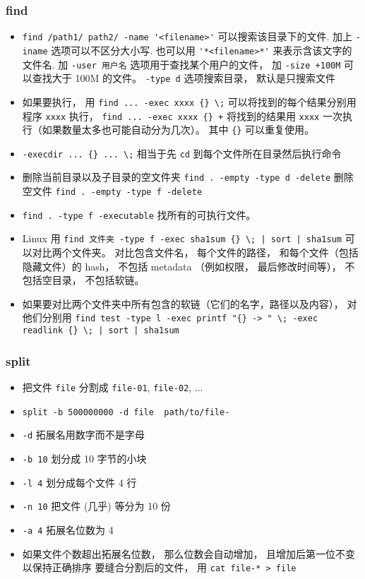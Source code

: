 \subsubsection{find}
\begin{itemize}
\item \verb`find /path1/ path2/ -name '<filename>'` 可以搜索该目录下的文件. 加上 \verb`-iname` 选项可以不区分大小写. 也可以用 \verb`'*<filename>*'` 来表示含该文字的文件名. 加 \verb`-user 用户名` 选项用于查找某个用户的文件， 加 \verb`-size +100M` 可以查找大于 100M 的文件。 \verb`-type d` 选项搜索目录， 默认是只搜索文件
\item 如果要执行， 用 \verb`find ... -exec xxxx {} \;` 可以将找到的每个结果分别用程序 \verb`xxxx` 执行， \verb`find ... -exec xxxx {} +` 将找到的结果用 \verb`xxxx` 一次执行（如果数量太多也可能自动分为几次）。 其中 \verb`{}` 可以重复使用。
\item \verb`-execdir ... {} ... \;` 相当于先 \verb`cd` 到每个文件所在目录然后执行命令
\item 删除当前目录以及子目录的空文件夹 \verb`find . -empty -type d -delete` 删除空文件 \verb`find . -empty -type f -delete`
\item \verb|find . -type f -executable| 找所有的可执行文件。
\item Linux 用 \verb`find 文件夹 -type f -exec sha1sum {} \; | sort | sha1sum` 可以对比两个文件夹。 对比包含文件名， 每个文件的路径， 和每个文件（包括隐藏文件）的 hash， 不包括 metadata （例如权限， 最后修改时间等）， 不包括空目录， 不包括软链。
\item 如果要对比两个文件夹中所有包含的软链（它们的名字，路径以及内容）， 对他们分别用 \verb`find test -type l -exec printf "{} -> " \; -exec readlink {} \; | sort | sha1sum`
\end{itemize}

\subsubsection{split}
\begin{itemize}
\item 把文件 \verb`file` 分割成 \verb`file-01`, \verb`file-02`, ...
\item \verb`split -b 500000000 -d file  path/to/file-`
\item \verb`-d` 拓展名用数字而不是字母
\item \verb`-b 10` 划分成 10 字节的小块
\item \verb`-l 4` 划分成每个文件 4 行
\item \verb`-n 10` 把文件 (几乎) 等分为 10 份
\item \verb`-a 4` 拓展名位数为 4
\item 如果文件个数超出拓展名位数， 那么位数会自动增加， 且增加后第一位不变以保持正确排序
要缝合分割后的文件， 用 \verb`cat file-* > file`
\end{itemize}

